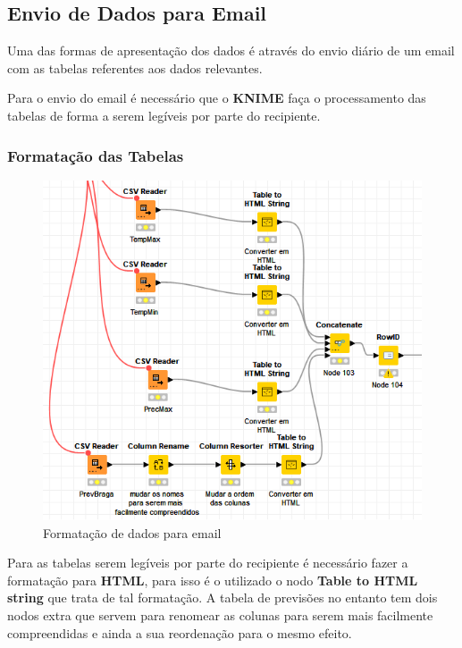\newpage
\subsection*{Envio de Dados para Email}

Uma das formas de apresentação dos dados é através do envio diário de um email com as tabelas referentes aos dados relevantes.

Para o envio do email é necessário que o \textbf{KNIME} faça o processamento das tabelas de forma a serem legíveis por parte do recipiente.

\subsubsection{Formatação das Tabelas}

\begin{figure}[H]
    \centering
    \includegraphics[scale=0.7]{imagens/sendemailgetdata.png}
    \caption{Formatação de dados para email}
\end{figure}

Para as tabelas serem legíveis por parte do recipiente é necessário fazer a formatação para \textbf{HTML}, para isso é o utilizado o nodo \textbf{Table to HTML string} que trata de tal formatação. A tabela de previsões no entanto tem dois nodos extra que servem para renomear as colunas para serem mais facilmente compreendidas e ainda a sua reordenação para o mesmo efeito.

